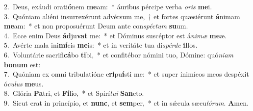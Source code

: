 {2.~}Deus, exáudi orati\textbf{ó}nem \textbf{me}am:~* áuribus pércipe verba \textit{o}\textit{ris} \textbf{me}i.\\
{3.~}Quóniam aliéni insurrexérunt advérsum me,~† et fortes quæsiérunt \textbf{á}nimam \textbf{me}am:~* et non proposuérunt Deum ante con\textit{spé}\textit{ctum} \textbf{su}um.\\
{4.~}Ecce enim Deus \textbf{ád}ju\textbf{vat} me:~* et Dóminus suscéptor est á\textit{ni}\textit{mæ} \textbf{me}æ.\\
{5.~}Avérte mala ini\textbf{mí}cis \textbf{me}is:~* et in veritáte tua di\textit{spér}\textit{de} \textbf{il}los.\\
{6.~}Voluntárie sacrifi\textbf{cá}bo \textbf{ti}bi,~* et confitébor nómini tuo, Dómine: quó\textit{ni}\textit{am} \textbf{bo}\textbf{num} est:\\
{7.~}Quóniam ex omni tribulatióne e\textbf{ri}pu\textbf{í}sti me:~* et super inimícos meos despéxit ó\textit{cu}\textit{lus} \textbf{me}us.\\
{8.~}Glória \textbf{Pa}tri, et \textbf{Fí}lio,~* et Spirí\textit{tu}\textit{i} \textbf{San}cto.\\
{9.~}Sicut erat in princípio, et \textbf{nunc}, et \textbf{sem}per,~* et in sǽcula sæcu\textit{ló}\textit{rum}. \textbf{A}men.\\
